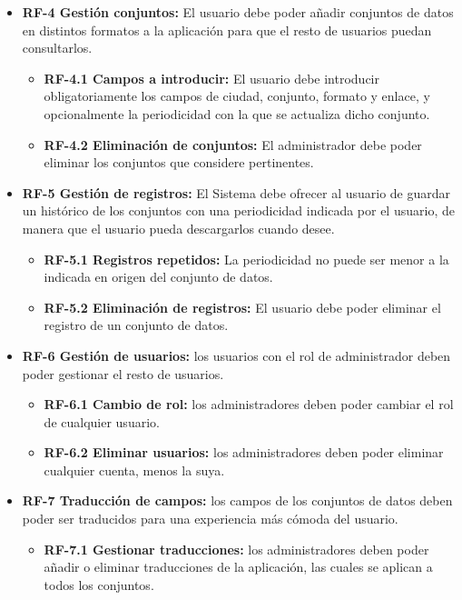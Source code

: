 \begin{itemize}
    \item \textbf{RF-4 Gestión conjuntos:} El usuario debe poder añadir conjuntos de datos en distintos formatos a la aplicación para que el resto de usuarios puedan consultarlos.
    \begin{itemize}
        \item \textbf{RF-4.1 Campos a introducir:} El usuario debe introducir obligatoriamente los campos de ciudad, conjunto, formato y enlace, y opcionalmente la periodicidad con la que se actualiza dicho conjunto.
        \item \textbf{RF-4.2 Eliminación de conjuntos:} El administrador debe poder eliminar los conjuntos que considere pertinentes.
    \end{itemize}

    \item \textbf{RF-5 Gestión de registros:} El Sistema debe ofrecer al usuario de guardar un histórico de los conjuntos con una periodicidad indicada por el usuario, de manera que el usuario pueda descargarlos cuando desee.
    \begin{itemize}
        \item \textbf{RF-5.1 Registros repetidos:} La periodicidad no puede ser menor a la indicada en origen del conjunto de datos.
        \item \textbf{RF-5.2 Eliminación de registros:} El usuario debe poder eliminar el registro de un conjunto de datos.
    \end{itemize}

    \item \textbf{RF-6 Gestión de usuarios:} los usuarios con el rol de administrador deben poder gestionar el resto de usuarios.
    \begin{itemize}
        \item \textbf{RF-6.1 Cambio de rol:} los administradores deben poder cambiar el rol de cualquier usuario.
        \item \textbf{RF-6.2 Eliminar usuarios:} los administradores deben poder eliminar cualquier cuenta, menos la suya.
    \end{itemize}

    \item \textbf{RF-7 Traducción de campos:} los campos de los conjuntos de datos deben poder ser traducidos para una experiencia más cómoda del usuario.
    \begin{itemize}
        \item \textbf{RF-7.1 Gestionar traducciones:} los administradores deben poder añadir o eliminar traducciones de la aplicación, las cuales se aplican a todos los conjuntos.
    \end{itemize}


\end{itemize}
